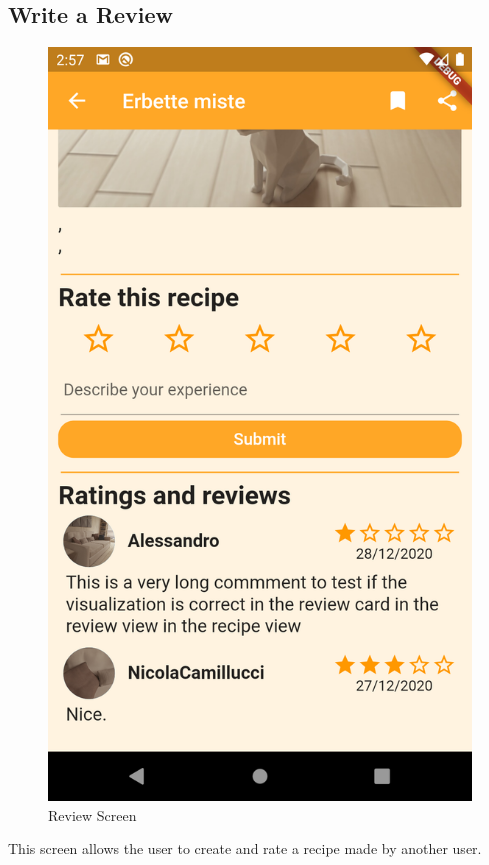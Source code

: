\subsection{Write a Review}
\begin{figure}[H]
	\centering
	\includegraphics{img/Review.png}
	\caption{Review Screen}
\end{figure}
This screen allows the user to create and rate a recipe made by another user.
